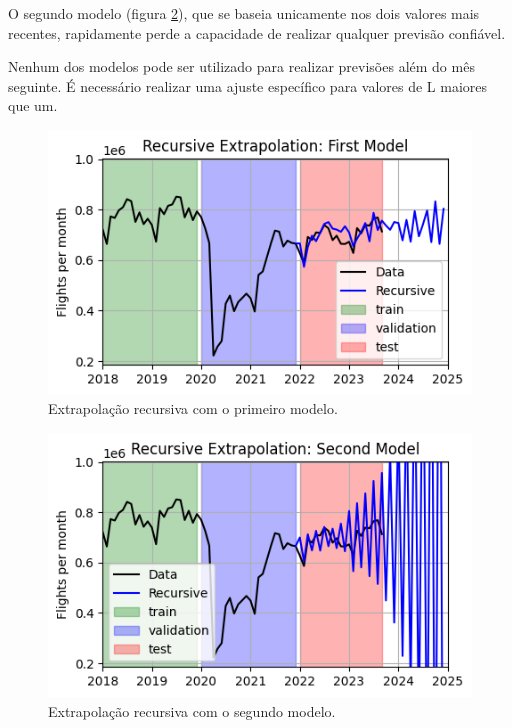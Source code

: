 \documentclass[final,5p]{elsarticle}
\numberwithin{equation}{section}
\begin{document}
        O segundo modelo (figura \ref{fig:extrapolacao_segundo_modelo}), que se baseia unicamente nos dois valores mais recentes, rapidamente perde a capacidade de realizar qualquer previsão confiável.

        Nenhum dos modelos pode ser utilizado para realizar previsões além do mês seguinte. É necessário realizar uma ajuste específico para valores de L maiores que um.

        \begin{figure}[hbt!]
            \includegraphics[width=0.95\columnwidth]{C3_RecursiveExtrapolation.png}
            \caption{Extrapolação recursiva com o primeiro modelo.}
            \label{fig:extrapolacao_primeiro_modelo}
        \end{figure}

        \begin{figure}[hbt!]
            \includegraphics[width=0.95\columnwidth]{C3_RecursiveExtrapolation_new.png}
            \caption{Extrapolação recursiva com o segundo modelo.}
            \label{fig:extrapolacao_segundo_modelo}
        \end{figure}
\end{document}
